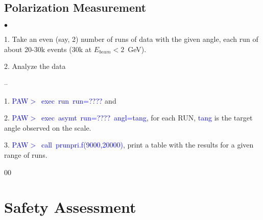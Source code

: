 {\subsection {Polarization Measurement }
\label{sec:polmeas}

\begin{list}{$\bullet$}{\setlength{\itemsep}{0.cm}}
  \item[1.] Take an even (say, 2) number  of runs of data with the given angle, each run of about 20-30k
            events (30k at $E_{beam}<2$~GeV).
  \item[2.] Analyze the data
        \begin{list}{--}{\setlength{\itemsep}{0.cm}}
             \item[1.] \textcolor{blue}{PAW$>$~exec~run~run=????} and
             \item[2.] \textcolor{blue}{PAW$>$~exec~asymt~run=????~angl=tang}, for each RUN,
                       \textcolor{blue}{tang} is the target angle observed on the scale.
             \item[3.] \textcolor{blue}{PAW$>$~call~prunpri.f(9000,20000)}, print a table
                       with the results for a given range of runs.
        \end{list}
\end{list}

} %

\begin{safetyen}{0}{0}
\section {Safety Assessment}
\label{sec:moller_safety}
\end{safetyen}


